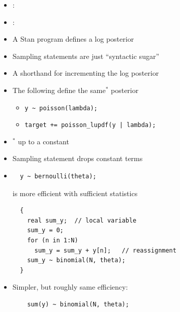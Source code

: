 \documentclass[10pt]{report}
\begin{document}
%
\begin{itemize}
\item {}: \ {\footnotesize {}}
\item {}:
\ {\footnotesize
    }
\end{itemize}


%
\begin{itemize}
\item A Stan program defines a log posterior
\item Sampling statements are just ``syntactic sugar''
\item A shorthand for incrementing the log posterior
\item The following define the same$^*$ posterior
\begin{itemize}
\item \Verb|y ~ poisson(lambda);|
\item \texttt{target += poisson\_lupdf(y | lambda);}
\end{itemize}
\item ${}^{*}$ up to a constant
\item Sampling statement drops constant terms
\end{itemize}



%
\begin{itemize}
\item
\begin{Verbatim}
  y ~ bernoulli(theta);
\end{Verbatim}
is more efficient with sufficient statistics
{\small
\begin{Verbatim}
  {
    real sum_y;  // local variable
    sum_y = 0;
    for (n in 1:N)
      sum_y = sum_y + y[n];   // reassignment
    sum_y ~ binomial(N, theta);
  }
\end{Verbatim}
}
\item Simpler, but roughly same efficiency:
\begin{Verbatim}
    sum(y) ~ binomial(N, theta);
\end{Verbatim}
\end{itemize}
\end{document}
